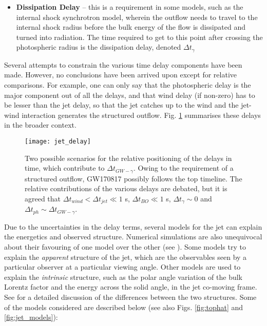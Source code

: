 \begin{itemize}
        \item \textbf{Dissipation Delay} -- this is a requirement in some models, such
            as the internal shock synchrotron model, wherein the outflow needs to travel
            to the internal shock radius before the bulk energy of the flow is
            dissipated and turned into radiation. The time required to get to this point
            after crossing the photospheric radius is the dissipation delay, denoted
            $\Delta t_{\gamma}$

    \end{itemize}

    Several attempts to constrain the various time delay components have been made.
    However, no conclusions have been arrived upon except for relative comparisons.  For
    example, one can only say that the photospheric delay is the major component out of
    all the delays, and that wind delay (if non-zero) has to be lesser than the jet
    delay, so that the jet catches up to the wind and the jet-wind interaction generates
    the structured outflow. Fig. \ref{fig:jet_delay} summarises these delays in the
    broader context.

    \begin{figure}[H]
        \centering
        \texttt{[image: jet\_delay]}
        \caption[Relative Positions of Jet Delays]
             {
                    Two possible scenarios for the relative positioning of the delays in
                    time, which contribute to $\Delta t_{GW-\gamma}$.  Owing to the
                    requirement of a structured outflow, GW170817 possibly follows the
                    top timeline. The relative contributions of the various delays are
                    debated, but it is agreed that $\Delta t_{wind} < \Delta t_{jet} \ll
                    1$ s, $\Delta t_{BO} \ll 1$ s, $\Delta t_{\gamma} \sim 0$ and
                    $\Delta t_{ph} \sim \Delta t_{GW-\gamma}$.
             }
        \label{fig:jet_delay}
    \end{figure}

    Due to the uncertainties in the delay terms, several models for the jet can explain
    the energetics and observed structure. Numerical simulations are also unequivocal
    about their favouring of one model over the other (see \cite{shibata_2019}).
    Some models try to explain the \textit{apparent} structure of the jet, which are the
    observables seen by a particular observer at a particular viewing angle. Other
    models are used to explain the \textit{intrinsic} structure, such as the polar angle
    variation of the bulk Lorentz factor and the energy across the solid angle, in the
    jet co-moving frame. See \cite{salafia_2015} for a detailed discussion of
    the differences between the two structures. Some of the models considered are
    described below (see also Figs. \ref{fig:tophat} and \ref{fig:jet_models}):

